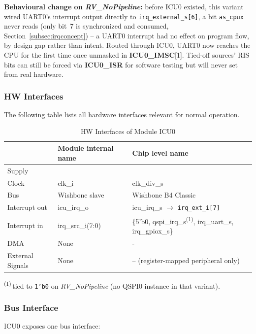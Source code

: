 \textbf{Behavioural change on \textit{RV\_NoPipeline}:} before ICU0
existed, this variant wired UART0's interrupt output directly to
\texttt{irq\_external\_s[6]}, a bit \texttt{as\_cpux} never reads (only
bit~7 is synchronized and consumed, Section~\ref{subsec:irqconcept}) -- a
UART0 interrupt had no effect on program flow, by design gap rather than
intent. Routed through ICU0, UART0 now reaches the CPU for the first time
once unmasked in \textbf{ICU0\_IMSC}[1]. Tied-off sources' RIS bits can
still be forced via \textbf{ICU0\_ISR} for software testing but will never
set from real hardware.

\subsubsection{HW Interfaces}
The following table lists all hardware interfaces relevant for normal operation.

\begin{table}[H]
\caption{HW Interfaces of Module ICU0}
\label{tab:asIcuPer02}
\centering
\begin{tabularx}{\textwidth}{|l |l |X|}
  \hline
   & Module internal name & Chip level name \\
  \hline
  \hline
  Supply &  &  \\
  \hline
  Clock & clk\_i & clk\_div\_s \\
  \hline
  Bus & Wishbone slave & Wishbone B4 Classic \\
  \hline
  Interrupt out & icu\_irq\_o & icu\_irq\_s $\to$ \texttt{irq\_ext\_i[7]} \\
  \hline
  Interrupt in & irq\_src\_i(7:0) & \{5'b0, qspi\_irq\_s\textsuperscript{(1)},
    irq\_uart\_s, irq\_gpiox\_s\} \\
  \hline
  DMA & None & - \\
  \hline
  External Signals & None & -- (register-mapped peripheral only) \\
  \hline
\end{tabularx}
\end{table}
\noindent\footnotesize\textsuperscript{(1)}\,tied to \texttt{1'b0} on
\textit{RV\_NoPipeline} (no QSPI0 instance in that variant).\normalsize

\subsubsection{Bus Interface}
ICU0 exposes one bus interface:


